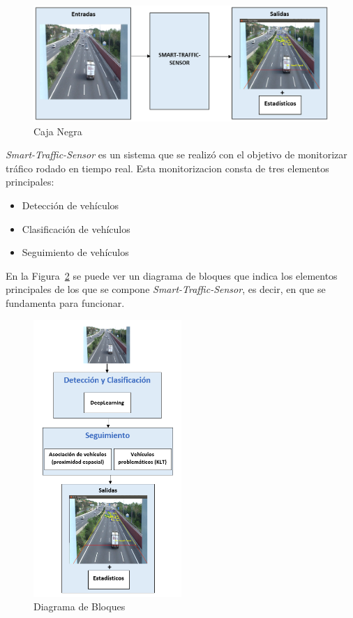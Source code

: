 \begin{figure}[H] 
\begin{center}
	\includegraphics[width=1\textwidth]{figures/Diseno_global/caja_negra.PNG}
   \caption{Caja Negra}
	\label{fig.caja_negra}
\end{center}
\end{figure}

\textit{Smart-Traffic-Sensor} es un sistema que se realizó con el objetivo de monitorizar tráfico rodado en tiempo real. Esta monitorizacion consta de tres elementos principales:

\begin{itemize}
    \item Detección de vehículos
    \item Clasificación de vehículos
    \item Seguimiento de vehículos
\end{itemize}

En la Figura~\ref{fig.diagrama_bloques} se puede ver un diagrama de bloques que indica los elementos principales de los que se compone \textit{Smart-Traffic-Sensor}, es decir, en que se fundamenta para funcionar.

\begin{figure}[H]
\begin{center}
	\includegraphics[width=0.5\textwidth]{figures/Diseno_global/diagrama_bloques.PNG}
   \caption{Diagrama de Bloques}
	\label{fig.diagrama_bloques}
\end{center}
\end{figure}

